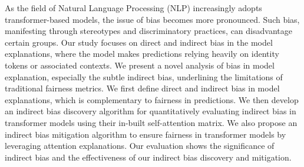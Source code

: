 As the field of Natural Language Processing (NLP) increasingly adopts transformer-based models, the issue of bias becomes more pronounced. Such bias, manifesting through stereotypes and discriminatory practices, can disadvantage certain groups. Our study focuses on direct and indirect bias in the model explanations, where the model makes predictions relying heavily on identity tokens or associated contexts. We present a novel analysis of bias in model explanation, especially the subtle indirect bias, underlining the limitations of traditional fairness metrics. We first define direct and indirect bias in model explanations, which is complementary to fairness in predictions. We then develop an indirect bias discovery algorithm for quantitatively evaluating indirect bias in transformer models using their in-built self-attention matrix. We also propose an indirect bias mitigation algorithm to ensure fairness in transformer models by leveraging attention explanations. Our evaluation shows the significance of indirect bias and the effectiveness of our indirect bias discovery and mitigation.